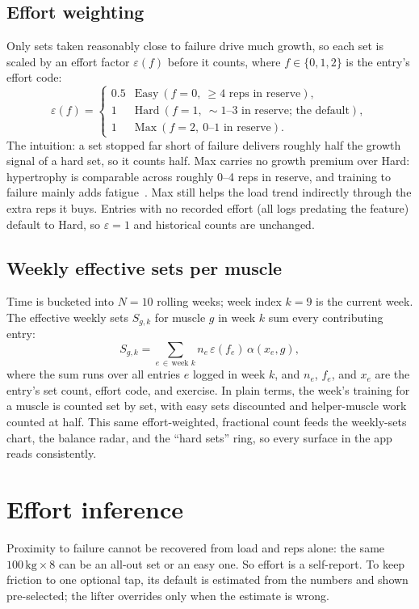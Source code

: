 \documentclass[11pt,a4paper]{article}
\newcommand{\eps}{\varepsilon}
\begin{document}
\subsection{Effort weighting}
Only sets taken reasonably close to failure drive much growth, so each set is scaled by an effort factor $\eps(f)$ before it counts, where $f\in\{0,1,2\}$ is the entry's effort code:
\begin{equation}\label{eq:eps}
\eps(f)=
\begin{cases}
0.5 & \text{Easy}\ (f{=}0,\ \geq 4\text{ reps in reserve}),\\
1 & \text{Hard}\ (f{=}1,\ {\sim}1\text{--}3\text{ in reserve; the default}),\\
1 & \text{Max}\ (f{=}2,\ 0\text{--}1\text{ in reserve}).
\end{cases}
\end{equation}
The intuition: a set stopped far short of failure delivers roughly half the growth signal of a hard set, so it counts half. Max carries no growth premium over Hard: hypertrophy is comparable across roughly 0--4 reps in reserve, and training to failure mainly adds fatigue~\cite{failureprox}. Max still helps the load trend indirectly through the extra reps it buys. Entries with no recorded effort (all logs predating the feature) default to Hard, so $\eps=1$ and historical counts are unchanged.

\subsection{Weekly effective sets per muscle}
Time is bucketed into $N=10$ rolling weeks; week index $k=9$ is the current week. The effective weekly sets $S_{g,k}$ for muscle $g$ in week $k$ sum every contributing entry:
\begin{equation}\label{eq:S}
S_{g,k}=\sum_{e\,\in\,\text{week }k} n_e\,\eps(f_e)\,\alpha(x_e,g),
\end{equation}
where the sum runs over all entries $e$ logged in week $k$, and $n_e$, $f_e$, and $x_e$ are the entry's set count, effort code, and exercise. In plain terms, the week's training for a muscle is counted set by set, with easy sets discounted and helper-muscle work counted at half. This same effort-weighted, fractional count feeds the weekly-sets chart, the balance radar, and the ``hard sets'' ring, so every surface in the app reads consistently.

\section{Effort inference}\label{sec:effort}
Proximity to failure cannot be recovered from load and reps alone: the same $100\,\text{kg}\times 8$ can be an all-out set or an easy one. So effort is a self-report. To keep friction to one optional tap, its default is estimated from the numbers and shown pre-selected; the lifter overrides only when the estimate is wrong.
\end{document}
